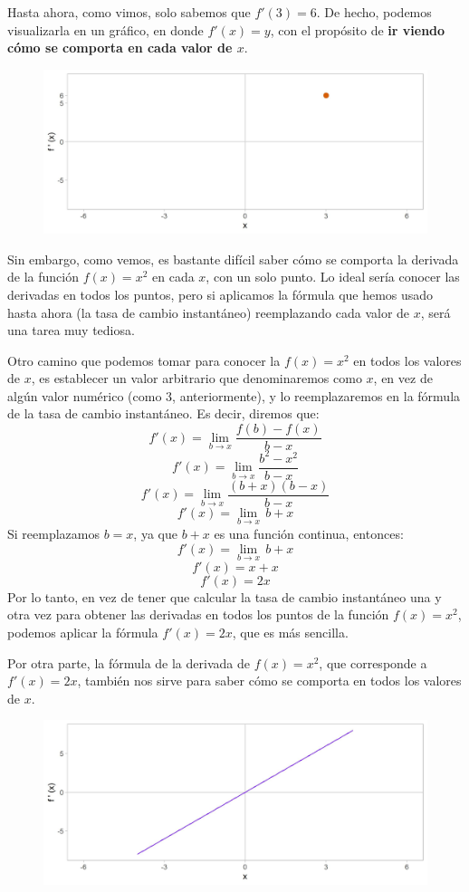 \documentclass[12pt]{article}
\begin{document}
Hasta ahora, como vimos, solo sabemos que $f'(3) = 6$. De hecho, podemos visualizarla en un gráfico, en donde $f'(x) = y$, con el propósito de \textbf{ir viendo cómo se comporta en cada valor de $x$}.

\begin{figure}[hbt!]
\centering
\includegraphics[scale=0.7]{img/deriv_secpow_one_pt.jpg}
\end{figure}

Sin embargo, como vemos, es bastante difícil saber cómo se comporta la derivada de la función $f(x) = x^{2}$ en cada $x$, con un solo punto. Lo ideal sería conocer las derivadas en todos los puntos, pero si aplicamos la fórmula que hemos usado hasta ahora (la tasa de cambio instantáneo) reemplazando cada valor de $x$, será una tarea muy tediosa. 

Otro camino que podemos tomar para conocer la $f(x) = x^{2}$ en todos los valores de $x$, es establecer un valor arbitrario que denominaremos como $x$, en vez de algún valor numérico (como $3$, anteriormente), y lo reemplazaremos en la fórmula de la tasa de cambio instantáneo. Es decir, diremos que:
\[f'(x) = \lim_{b \to x} \frac{f(b)-f(x)}{b-x}\]
\[f'(x) = \lim_{b \to x} \frac{b^{2}-x^{2}}{b-x}\]
\[f'(x) = \lim_{b \to x} \frac{(b+x)(b-x)}{b-x}\]
\[f'(x) = \lim_{b \to x} \, b+x\]
Si reemplazamos $b = x$, ya que $b+x$ es una función continua, entonces:
\[f'(x) = \lim_{b \to x} \, b+x\]
\[f'(x) = x+x\]
\[f'(x) = 2x\]
Por lo tanto, en vez de tener que calcular la tasa de cambio instantáneo una y otra vez para obtener las derivadas en todos los puntos de la función $f(x) = x^{2}$, podemos aplicar la fórmula $f'(x) = 2x$, que es más sencilla.

Por otra parte, la fórmula de la derivada de $f(x) = x^{2}$, que corresponde a $f'(x) = 2x$, también nos sirve para saber cómo se comporta en todos los valores de $x$.

\newpage

\begin{figure}[hbt!]
\centering
\includegraphics[scale=0.7]{img/deriv_secpow_fun.jpg}
\end{figure}
\end{document}

